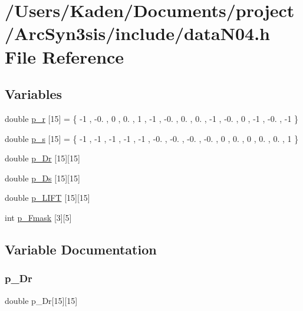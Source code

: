 \hypertarget{a00515}{}\section{/\+Users/\+Kaden/\+Documents/project/\+Arc\+Syn3sis/include/data\+N04.h File Reference}
\label{a00515}
\subsection*{Variables}
\begin{DoxyCompactItemize}
\item 
double \hyperlink{a00515_a7f75af9b47d708e0a032f0a11367b294}{p\+\_\+r} \mbox{[}15\mbox{]} = \{ -\/1 , -\/0. , 0 , 0. , 1 , -\/1 , -\/0. , 0. , 0. , -\/1 , -\/0. , 0 , -\/1 , -\/0. , -\/1 \}
\item 
double \hyperlink{a00515_a8a69f6bb8b7800049e49705a31ceb055}{p\+\_\+s} \mbox{[}15\mbox{]} = \{ -\/1 , -\/1 , -\/1 , -\/1 , -\/1 , -\/0. , -\/0. , -\/0. , -\/0. , 0 , 0. , 0 , 0. , 0. , 1 \}
\item 
double \hyperlink{a00515_a2a8483d7a555fd078e93d9bfbcc47c68}{p\+\_\+\+Dr} \mbox{[}15\mbox{]}\mbox{[}15\mbox{]}
\item 
double \hyperlink{a00515_a0d83f56b559ca5d47e6c6667c03a1ef3}{p\+\_\+\+Ds} \mbox{[}15\mbox{]}\mbox{[}15\mbox{]}
\item 
double \hyperlink{a00515_a76c7bb07fd19526963754351ba297f11}{p\+\_\+\+L\+I\+FT} \mbox{[}15\mbox{]}\mbox{[}15\mbox{]}
\item 
int \hyperlink{a00515_a704fa8b9733c702ccc04c6c323f3dfa6}{p\+\_\+\+Fmask} \mbox{[}3\mbox{]}\mbox{[}5\mbox{]}
\end{DoxyCompactItemize}


\subsection{Variable Documentation}
\mbox{\label{a00515_a2a8483d7a555fd078e93d9bfbcc47c68}} 
\subsubsection{\texorpdfstring{p\+\_\+\+Dr}{p\_Dr}}
{\footnotesize\ttfamily double p\+\_\+\+Dr\mbox{[}15\mbox{]}\mbox{[}15\mbox{]}}


